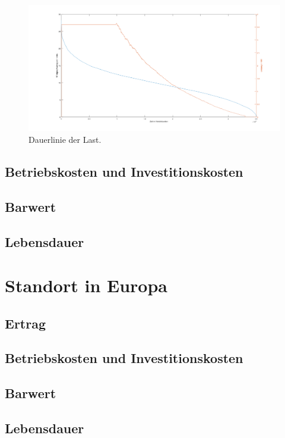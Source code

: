 \documentclass[a4paper,12pt]{article}
\begin{document}
	\begin{figure}[H]
		\centering
		\includegraphics[width=12cm]{img/results/Dauerlinie_Offshore}
		\caption{Dauerlinie der Last.}
	\end{figure}
	\subsection{Betriebskosten und Investitionskosten}
	\subsection{Barwert}
	\subsection{Lebensdauer}
	\section{Standort in Europa}
	\subsection{Ertrag}
	\subsection{Betriebskosten und Investitionskosten}
	\subsection{Barwert}
	\subsection{Lebensdauer}
	\newpage
	\listoffigures
	
\end{document}

